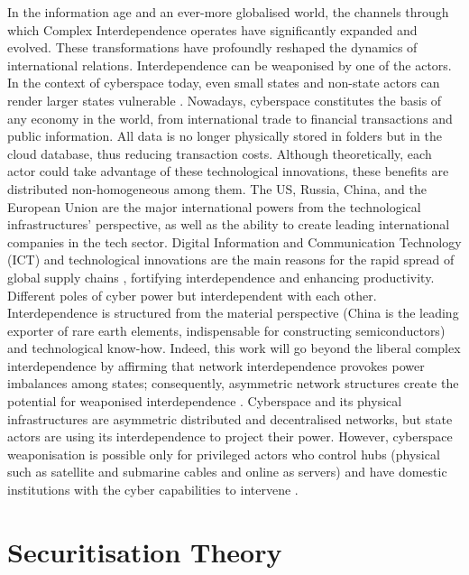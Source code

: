 In the information age and an ever-more globalised world, the channels through which Complex Interdependence operates have significantly expanded and evolved. These transformations have profoundly reshaped the dynamics of international relations. Interdependence can be weaponised by one of the actors. In the context of cyberspace today, even small states and non-state actors can render larger states vulnerable \parencite{farrell_2019_weaponized, nye_1971_transnational}. Nowadays, cyberspace constitutes the basis of any economy in the world, from international trade to financial transactions and public information. All data is no longer physically stored in folders but in the cloud database, thus reducing transaction costs. Although theoretically, each actor could take advantage of these technological innovations, these benefits are distributed non-homogeneous among them. The US, Russia, China, and the European Union are the major international powers from the technological infrastructures' perspective, as well as the ability to create leading international companies in the tech sector. Digital Information and Communication Technology (ICT) and technological innovations are the main reasons for the rapid spread of global supply chains \autocite{mansfield_2021_embedded}, fortifying interdependence and enhancing productivity. Different poles of cyber power but interdependent with each other. Interdependence is structured from the material perspective (China is the leading exporter of rare earth elements, indispensable for constructing semiconductors) and technological know-how. Indeed, this work will go beyond the liberal complex interdependence by affirming that network interdependence provokes power imbalances among states; consequently, asymmetric network structures create the potential for weaponised interdependence \autocite[45]{farrell_2019_weaponized}. Cyberspace and its physical infrastructures are asymmetric distributed and decentralised networks, but state actors are using its interdependence to project their power. However, cyberspace weaponisation is possible only for privileged actors who control hubs (physical such as satellite and submarine cables and online as servers) and have domestic institutions with the cyber capabilities to intervene \autocite{farrell_2019_weaponized}.

\section{Securitisation Theory}

